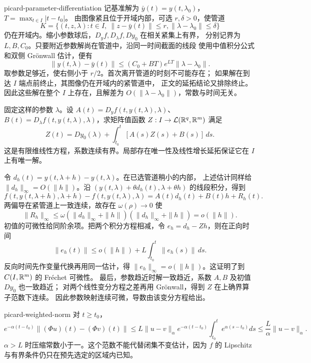 \begin{solution}{picard-parameter-differentiation}
记基准解为 \(\bar y(t)=y(t,\lambda_0)\)，\(T=\max_{t\in I}|t-t_0|\)。
由图像紧且位于开域内部，可选 \(r,\delta>0\)，使管道
\[
 K=\{(t,z,\lambda):t\in I,\ \|z-\bar y(t)\|\le r,
                  \|\lambda-\lambda_0\|\le\delta\}
\]
仍在开域内。缩小参数球后，\(D_yf,D_\lambda f,Dy_0\) 在相关紧集上有界，
分别记界为 \(L,B,C_0\)。只要附近参数解尚在管道中，沿同一时间截面的线段
使用中值积分公式和双侧 Grönwall 估计，便有
\[
 \|y(t,\lambda)-\bar y(t)\|
 \le (C_0+BT)e^{LT}\|\lambda-\lambda_0\|.
\]
取参数足够近，使右侧小于 \(r/2\)。首次离开管道的时刻不可能存在；
如果解在到达 \(I\) 端点前终止，其图像仍在开域内的紧管道中，
正文的延拓结论又排除终止。因此这些解在整个 \(I\) 上存在，且解差为
\(O(\|\lambda-\lambda_0\|)\)，常数与时间无关。

固定这样的参数 \(\lambda\)。设
\(A(t)=D_yf(t,y(t,\lambda),\lambda)\)、
\(B(t)=D_\lambda f(t,y(t,\lambda),\lambda)\)，求矩阵值函数
\(Z:I\to\mathcal L(\mathbb{R}^q,\mathbb{R}^m)\) 满足
\[
 Z(t)=Dy_0(\lambda)+\int_{t_0}^{t}[A(s)Z(s)+B(s)]\,ds.
\]
这是有限维线性方程，系数连续有界。局部存在唯一性及线性增长延拓保证它在
\(I\) 上有唯一解。

令 \(d_h(t)=y(t,\lambda+h)-y(t,\lambda)\)。在已选管道稍小的内部，
上述估计同样给 \(\|d_h\|_\infty=O(\|h\|)\)。沿
\((y(t,\lambda)+\theta d_h(t),\lambda+\theta h)\) 的线段积分，得到
\[
 f(t,y(t,\lambda+h),\lambda+h)-f(t,y(t,\lambda),\lambda)
 =A(t)d_h(t)+B(t)h+R_h(t).
\]
两偏导在紧管道上一致连续，故存在 \(\omega(\rho)\to0\) 使
\[
 \|R_h\|_\infty\le
 \omega(\|d_h\|_\infty+\|h\|)(\|d_h\|_\infty+\|h\|)
 =o(\|h\|).
\]
初值的可微性给同阶余项。把两个积分方程相减，令
\(e_h=d_h-Zh\)，则在正向时间
\[
 \|e_h(t)\|\le o(\|h\|)+L\int_{t_0}^t\|e_h(s)\|\,ds.
\]
反向时间先作变量代换再用同一估计，得
\(\|e_h\|_\infty=o(\|h\|)\)。这证明了到 \(C(I,\mathbb{R}^m)\) 的 Fréchet 可微性。
最后，参数趋近时解一致趋近，系数 \(A,B\) 及初值 \(Dy_0\) 也一致趋近；
对两个线性变分方程之差再用 Grönwall，得到 \(Z\) 在上确界算子范数下连续。
因此参数映射连续可微，导数由该变分方程给出。
\end{solution}

\begin{solution}{picard-weighted-norm}
对 \(t\ge t_0\)，
\[
 e^{-\alpha(t-t_0)}\|(\Phi u)(t)-(\Phi v)(t)\|
 \le L\|u-v\|_\alpha e^{-\alpha(t-t_0)}
 \int_{t_0}^{t}e^{\alpha(s-t_0)}ds
 \le\frac L\alpha\|u-v\|_\alpha.
\]
\(\alpha>L\) 时压缩常数小于一。这个范数不能代替闭集不变估计，因为
\(f\) 的 Lipschitz 与有界条件仍只在预先选定的区域内已知。
\end{solution}
